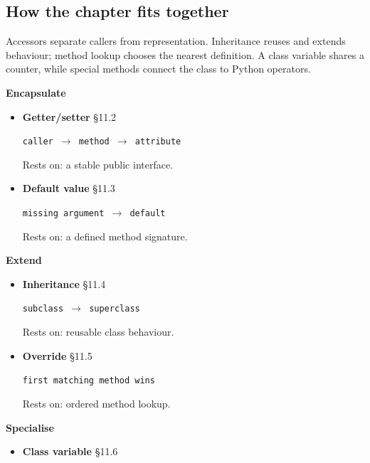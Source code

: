 \documentclass[11pt]{article}
\begin{document}
\begin{keepsection}
\section{How the chapter fits together}

Accessors separate callers from representation. Inheritance reuses and extends behaviour; method lookup chooses the nearest definition. A class variable shares a counter, while special methods connect the class to Python operators.

\textbf{Encapsulate}

\begin{itemize}
\item {}
\textbf{Getter/setter} \hfill{\small\color{FAUblue}§11.2}

\texttt{caller \ensuremath{\to} method \ensuremath{\to} attribute}

Rests on: a stable public interface.
\item {}
\textbf{Default value} \hfill{\small\color{FAUblue}§11.3}

\texttt{missing argument \ensuremath{\to} default}

Rests on: a defined method signature.
\end{itemize}

\textbf{Extend}

\begin{itemize}
\item {}
\textbf{Inheritance} \hfill{\small\color{FAUblue}§11.4}

\texttt{subclass \ensuremath{\to} superclass}

Rests on: reusable class behaviour.
\item {}
\textbf{Override} \hfill{\small\color{FAUblue}§11.5}

\texttt{first matching method wins}

Rests on: ordered method lookup.
\end{itemize}

\textbf{Specialise}

\begin{itemize}
\item {}
\textbf{Class variable} \hfill{\small\color{FAUblue}§11.6}


\end{itemize}
\end{keepsection}
\end{document}
